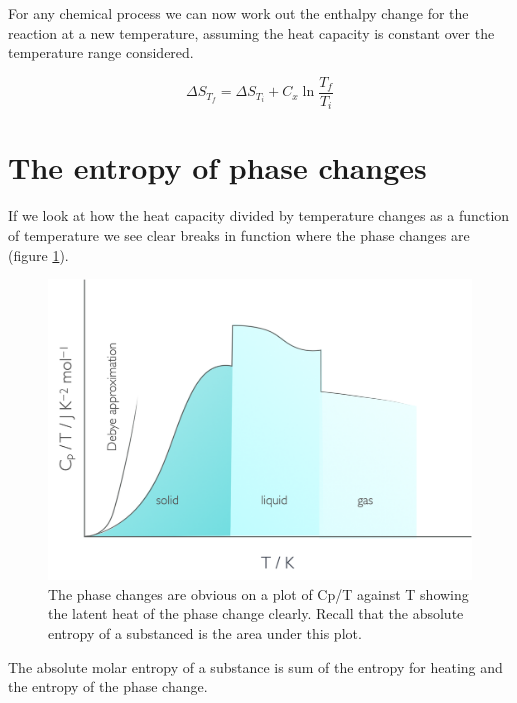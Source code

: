 \documentclass[
]{book}
\begin{document}
For any chemical process we can now work out the enthalpy change for the reaction at a new temperature, assuming the heat capacity is constant over the temperature range considered.

\begin{equation}
\Delta S_{T_f} = \Delta S_{T_i} + C_x \ln \frac{T_f}{T_i}
\label{eq:entropyrxntemp}
\end{equation}

\hypertarget{the-entropy-of-phase-changes}{%
\section{The entropy of phase changes}\label{the-entropy-of-phase-changes}}

If we look at how the heat capacity divided by temperature changes as a function of temperature we see clear breaks in function where the phase changes are (figure \ref{fig:Cpphase}).

\begin{figure}

{\centering \includegraphics[width=0.8\linewidth]{images/Cpphase} 

}

\caption{The phase changes are obvious on a plot of Cp/T against T showing the latent heat of the phase change clearly. Recall that the absolute entropy of a substanced is the area under this plot.}\label{fig:Cpphase}
\end{figure}

The absolute molar entropy of a substance is sum of the entropy for heating and the entropy of the phase change.
\end{document}
